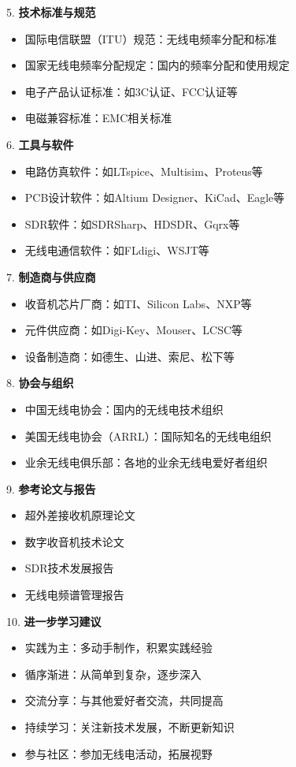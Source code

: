 \documentclass[12pt,UTF8]{ctexbook}
\begin{document}
5. \textbf{技术标准与规范}
   \begin{itemize}[leftmargin=3.5em]
   \item 国际电信联盟（ITU）规范：无线电频率分配和标准
   \item 国家无线电频率分配规定：国内的频率分配和使用规定
   \item 电子产品认证标准：如3C认证、FCC认证等
   \item 电磁兼容标准：EMC相关标准
   \end{itemize}

6. \textbf{工具与软件}
   \begin{itemize}[leftmargin=3.5em]
   \item 电路仿真软件：如LTspice、Multisim、Proteus等
   \item PCB设计软件：如Altium Designer、KiCad、Eagle等
   \item SDR软件：如SDRSharp、HDSDR、Gqrx等
   \item 无线电通信软件：如FLdigi、WSJT等
   \end{itemize}

7. \textbf{制造商与供应商}
   \begin{itemize}[leftmargin=3.5em]
   \item 收音机芯片厂商：如TI、Silicon Labs、NXP等
   \item 元件供应商：如Digi-Key、Mouser、LCSC等
   \item 设备制造商：如德生、山进、索尼、松下等
   \end{itemize}

8. \textbf{协会与组织}
   \begin{itemize}[leftmargin=3.5em]
   \item 中国无线电协会：国内的无线电技术组织
   \item 美国无线电协会（ARRL）：国际知名的无线电组织
   \item 业余无线电俱乐部：各地的业余无线电爱好者组织
   \end{itemize}

9. \textbf{参考论文与报告}
   \begin{itemize}[leftmargin=3.5em]
   \item 超外差接收机原理论文
   \item 数字收音机技术论文
   \item SDR技术发展报告
   \item 无线电频谱管理报告
   \end{itemize}

10. \textbf{进一步学习建议}
    \begin{itemize}[leftmargin=3.5em]
    \item 实践为主：多动手制作，积累实践经验
    \item 循序渐进：从简单到复杂，逐步深入
    \item 交流分享：与其他爱好者交流，共同提高
    \item 持续学习：关注新技术发展，不断更新知识
    \item 参与社区：参加无线电活动，拓展视野
    \end{itemize}
\end{document}
